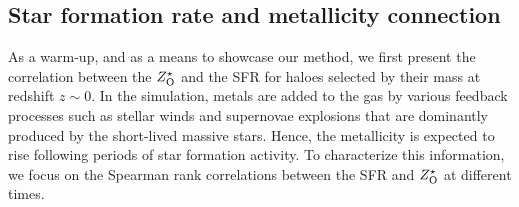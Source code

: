 \subsection{Star formation rate and metallicity connection}
\label{sec:sfr-metallicity}
As a warm-up, and as a means to showcase our method, we first present the correlation between the $Z^{\star}_{\rm{O}}$ 
and the SFR for haloes selected by their mass at redshift $z\sim 0$. 
In the simulation, metals are added to the gas by various feedback processes such as stellar winds and supernovae explosions that are dominantly produced by the short-lived massive stars. Hence, the metallicity is expected to rise following periods of star formation activity. To characterize this information, we focus on the Spearman rank correlations between the SFR and $Z^{\star}_{\rm{O}}$ at different times.

